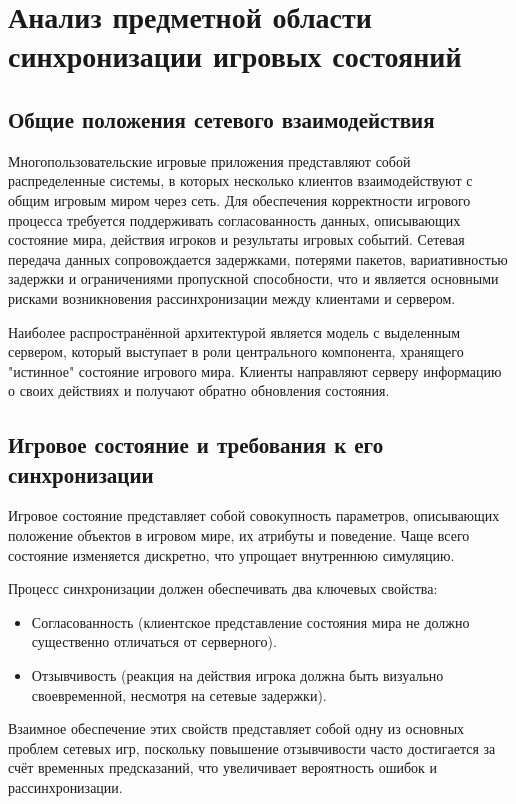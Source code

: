 \chapter{Анализ предметной области синхронизации игровых состояний}

\section{Общие положения сетевого взаимодействия}

Многопользовательские игровые приложения\cite{smed2002networkgames} представляют собой распределенные системы\cite{tanenbaum2017distributed}, в которых несколько клиентов взаимодействуют с общим игровым миром через сеть. Для обеспечения корректности игрового процесса требуется поддерживать согласованность данных, описывающих состояние мира, действия игроков и результаты игровых событий. Сетевая передача данных сопровождается задержками, потерями пакетов, вариативностью задержки и ограничениями пропускной способности, что и является основными рисками возникновения рассинхронизации между клиентами и сервером.

Наиболее распространённой архитектурой\cite{gamedevnetsync} является модель с выделенным сервером, который выступает в роли центрального компонента, хранящего "истинное" состояние игрового мира. Клиенты направляют серверу информацию о своих действиях и получают обратно обновления состояния.

\section{Игровое состояние и требования к его синхронизации}

Игровое состояние представляет собой совокупность параметров, описывающих положение объектов в игровом мире, их атрибуты и поведение. Чаще всего состояние изменяется дискретно, что упрощает внутреннюю симуляцию.

Процесс синхронизации должен обеспечивать два ключевых свойства:

\begin{itemize}
    \item Согласованность (клиентское представление состояния мира не должно существенно отличаться от серверного).
    \item Отзывчивость (реакция на действия игрока должна быть визуально своевременной, несмотря на сетевые задержки).
\end{itemize}

Взаимное обеспечение этих свойств представляет собой одну из основных проблем сетевых игр, поскольку повышение отзывчивости часто достигается за счёт временных предсказаний, что увеличивает вероятность ошибок и рассинхронизации.

